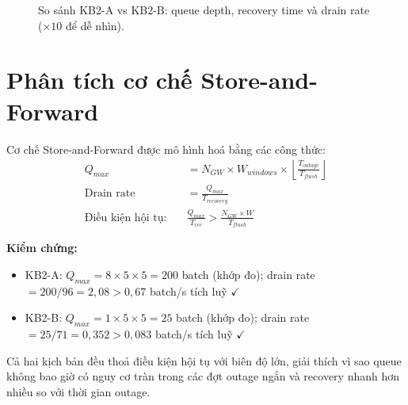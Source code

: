 \documentclass[13pt,a4paper]{report}
\begin{document}
\begin{figure}[H]
\centering
{}
\caption{So sánh KB2-A vs KB2-B: queue depth, recovery time và drain rate ($\times 10$ để dễ nhìn).}
\label{fig:kb2-compare}
\end{figure}

\section{Phân tích cơ chế Store-and-Forward}

Cơ chế Store-and-Forward được mô hình hoá bằng các công thức:
\begin{align}
Q_{max} &= N_{GW} \times W_{windows} \times \left\lfloor \frac{T_{outage}}{T_{flush}} \right\rfloor \\
\text{Drain rate} &= \frac{Q_{max}}{T_{recovery}} \\
\text{Điều kiện hội tụ:}\quad & \frac{Q_{max}}{T_{rec}} > \frac{N_{GW} \times W}{T_{flush}}
\end{align}

\textbf{Kiểm chứng:}
\begin{itemize}
  \item KB2-A: $Q_{max} = 8 \times 5 \times 5 = 200$ batch (khớp đo);
        drain rate $= 200/96 = 2{,}08 > 0{,}67$ batch/s tích luỹ $\checkmark$
  \item KB2-B: $Q_{max} = 1 \times 5 \times 5 = 25$ batch (khớp đo);
        drain rate $= 25/71 = 0{,}352 > 0{,}083$ batch/s tích luỹ $\checkmark$
\end{itemize}

Cả hai kịch bản đều thoả điều kiện hội tụ với biên độ lớn, giải thích vì sao
queue không bao giờ có nguy cơ tràn trong các đợt outage ngắn và recovery nhanh
hơn nhiều so với thời gian outage.
\end{document}
